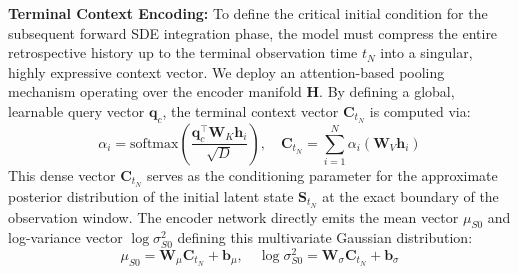 \textbf{Terminal Context Encoding:} To define the critical initial condition for the subsequent forward SDE integration phase, the model must compress the entire retrospective history up to the terminal observation time $t_N$ into a singular, highly expressive context vector. We deploy an attention-based pooling mechanism operating over the encoder manifold $\mathbf{H}$. By defining a global, learnable query vector $\mathbf{q}_c$, the terminal context vector $\mathbf{C}_{t_N}$ is computed via:
\begin{equation}
\alpha_i = \text{softmax} \left( \frac{\mathbf{q}_c^\top \mathbf{W}_K \mathbf{h}_i}{\sqrt{D}} \right), \quad \mathbf{C}_{t_N} = \sum_{i=1}^N \alpha_i (\mathbf{W}_V \mathbf{h}_i)
\end{equation}
This dense vector $\mathbf{C}_{t_N}$ serves as the conditioning parameter for the approximate posterior distribution of the initial latent state $\mathbf{S}_{t_N}$ at the exact boundary of the observation window. The encoder network directly emits the mean vector $\mu_{S0}$ and log-variance vector $\log \sigma_{S0}^2$ defining this multivariate Gaussian distribution:
\begin{equation}
\mu_{S0} = \mathbf{W}_\mu \mathbf{C}_{t_N} + \mathbf{b}_\mu, \quad \log \sigma_{S0}^2 = \mathbf{W}_\sigma \mathbf{C}_{t_N} + \mathbf{b}_\sigma
\end{equation}

